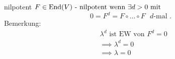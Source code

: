 \documentclass[class=article, crop=false]{standalone}
\begin{document}
\begin{zettel}{nilpotent}
$F \in  \operatorname{End}(V) \text{ - nilpotent wenn } \exists d > 0 \text{ mit }$
\[
    0 = F^{d} = F \circ \dots \circ  F \text{ $d$-mal }
.\]
Bemerkung:
\begin{align*}
    & \lambda^d \text{ ist EW von } F^{d} = 0\\
    & \implies \lambda^d = 0\\
    & \implies \lambda  = 0
\end{align*}

\end{zettel}
\end{document}
